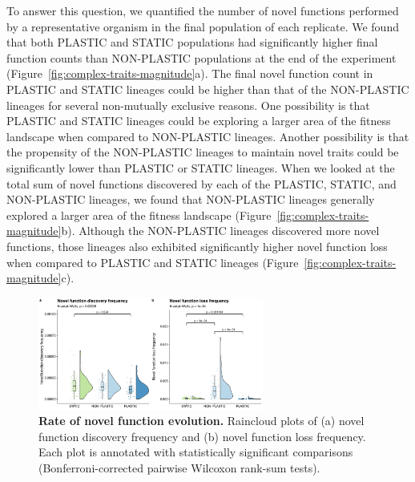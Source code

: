 \begin{raggedbottom}
To answer this question, we quantified the number of novel functions performed by a representative organism in the final population of each replicate.
We found that both PLASTIC and STATIC populations had significantly higher final function counts than NON-PLASTIC populations at the end of the experiment (Figure~\ref{fig:complex-traits-magnitude}a).
The final novel function count in PLASTIC and STATIC lineages could be higher than that of the NON-PLASTIC lineages for several non-mutually exclusive reasons.
One possibility is that PLASTIC and STATIC lineages could be exploring a larger area of the fitness landscape when compared to NON-PLASTIC lineages.
Another possibility is that the propensity of the NON-PLASTIC lineages to maintain novel traits could be significantly lower than PLASTIC or STATIC lineages.
When we looked at the total sum of novel functions discovered by each of the PLASTIC, STATIC, and NON-PLASTIC lineages, we found that NON-PLASTIC lineages generally explored a larger area of the fitness landscape (Figure~\ref{fig:complex-traits-magnitude}b).
Although the NON-PLASTIC lineages discovered more novel functions, those lineages also exhibited significantly higher novel function loss when compared to PLASTIC and STATIC lineages (Figure~\ref{fig:complex-traits-magnitude}c).

\begin{figure}[h!]
  \centering
  \includegraphics[width=0.66\textwidth]{05_consequences_of_plasticity/media/media-complex-traits-pace-panel.pdf}
  \caption{\small
  \textbf{Rate of novel function evolution.}
  Raincloud plots of
  (a) novel function discovery frequency
  and (b) novel function loss frequency.
  Each plot is annotated with statistically significant comparisons (Bonferroni-corrected pairwise Wilcoxon rank-sum tests).
  }
  \label{fig:complex-traits-rate}
\end{figure}


\end{raggedbottom}

